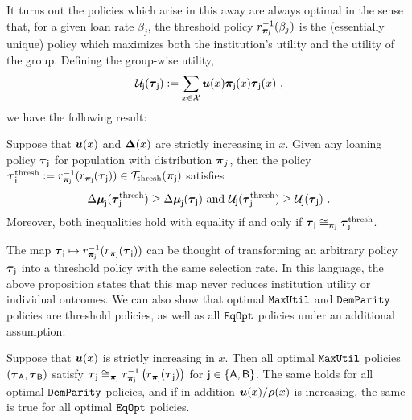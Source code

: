 	It turns out the policies which arise in this away are always optimal in the sense that, for a given loan rate $\beta_j$, 
	the threshold policy $\ratef_{\distj}^{-1}(\beta_j)$ is the (essentially unique) policy which maximizes both the institution's utility and the utility of the group. Defining the group-wise utility, 
	\begin{eqnarray} \label{eq:util_group_shorthand}
			\Util\supj(\polj) := \sum_{x \in \X} \util(x) \distj(x) \polj(x)~,
	\end{eqnarray}
	we have the following result: 
	\begin{prop}\label{prop:monotone_best} Suppose that $\util(x)$ and $\chg(x)$ are strictly increasing in $x$. Given any loaning policy $\polj$ for population with distribution $\dist_j$, then the policy $\pol\supj^{\mono} := \ratef_{\distj}^{-1}(\ratef_{\distj}(\polj)) \in \Monotone(\distj)$ satisfies 
	\begin{eqnarray}
	\delmean\supj(\polj^\mono) \ge \delmean\supj(\polj)~\text{and}~\Util\supj(\polj^\mono) \ge \Util\supj(\polj)~.
	\end{eqnarray}
	 Moreover, both inequalities hold with equality if and only if $\pol\supj \simj \pol\supj^{\mono}$. 
	\end{prop} 
	The map $\polj \mapsto \ratefj^{-1}(\ratefj(\polj))$ can be thought of transforming an arbitrary policy $\polj$ into a threshold policy with the same selection rate. 
	In this language, the above proposition states that this map never reduces institution utility or individual outcomes. 
	We can also show that optimal $\maxprof$ and $\dempar$ policies are threshold policies, as well as all $\eqop$ policies under an additional assumption:
	\begin{prop}\label{prop:opt_threshold_fair} Suppose that $\util(x)$ is strictly increasing in $x$. Then all optimal $\maxprof$ policies $(\pola,\polb)$ 
	satisfy $\polj \simj \ratefj^{-1}\left(\ratefj(\polj)\right)$  for $\popj \in \pops$.
	The same holds for all optimal $\dempar$ policies, and if in addition $\util(x)/\pb(x)$ is increasing, the same is true for all optimal $\eqop$ policies. 
	\end{prop}

